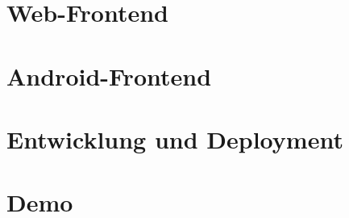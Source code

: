 \documentclass{beamer}
\begin{document}
\section{Web-Frontend}
\section{Android-Frontend}
\section{Entwicklung und Deployment}
\section{Demo}
\end{document}
